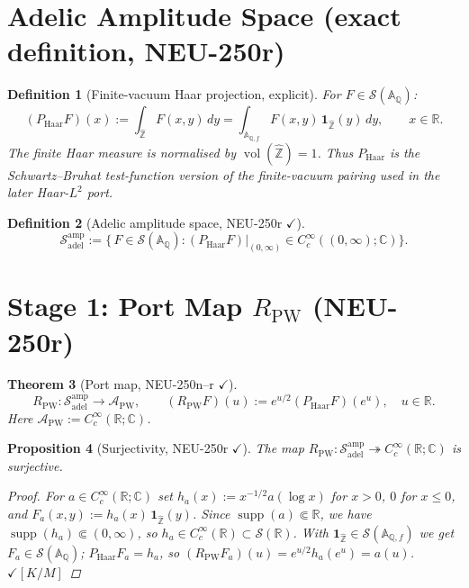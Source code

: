 \documentclass[11pt,a4paper]{amsart}
\newtheorem{theorem}{Theorem}[section]
\newtheorem{proposition}[theorem]{Proposition}
\newtheorem{definition}[theorem]{Definition}
\begin{document}
\section{Adelic Amplitude Space (exact definition, NEU-250r)}

\begin{definition}[Finite-vacuum Haar projection, explicit]\label{def:haar}
For $F\in\mathcal{S}(\mathbb{A}_{\mathbb{Q}})$:
\[
  \boxed{
  (P_{\mathrm{Haar}}F)(x)
  := \int_{\widehat{\mathbb Z}} F(x,y)\,dy
  = \int_{\mathbb A_{\mathbb Q,f}}
      F(x,y)\,\mathbf 1_{\widehat{\mathbb Z}}(y)\,dy,
  \qquad x\in\mathbb{R}.}
\]
The finite Haar measure is normalised by
$\operatorname{vol}(\widehat{\mathbb Z})=1$.
Thus $P_{\mathrm{Haar}}$ is the Schwartz--Bruhat test-function version of the
finite-vacuum pairing used in the later Haar-$L^2$ port.
\end{definition}

\begin{definition}[Adelic amplitude space, NEU-250r $\checkmark$]
\[
  \boxed{
  \mathcal{S}_{\mathrm{adel}}^{\mathrm{amp}} :=
  \bigl\{\, F\in\mathcal{S}(\mathbb{A}_{\mathbb{Q}}) :
  (P_{\mathrm{Haar}}F)|_{(0,\infty)} \in C_c^\infty((0,\infty);\mathbb{C})
  \bigr\}.}
\]
\end{definition}

\section{Stage 1: Port Map $R_{\mathrm{PW}}$ (NEU-250r)}

\begin{theorem}[Port map, NEU-250n--r $\checkmark$]
\[
  \boxed{
  R_{\mathrm{PW}} : \mathcal{S}_{\mathrm{adel}}^{\mathrm{amp}}
  \longrightarrow \mathcal{A}_{\mathrm{PW}},
  \qquad
  (R_{\mathrm{PW}}F)(u) := e^{u/2}(P_{\mathrm{Haar}}F)(e^u),
  \quad u\in\mathbb{R}.}
\]
Here $\mathcal{A}_{\mathrm{PW}}:=C_c^\infty(\mathbb{R};\mathbb{C})$.
\end{theorem}

\begin{proposition}[Surjectivity, NEU-250r $\checkmark$]
\label{prop:rpw-surjective}
The map $R_{\mathrm{PW}}:\mathcal{S}_{\mathrm{adel}}^{\mathrm{amp}}
\twoheadrightarrow C_c^\infty(\mathbb{R};\mathbb{C})$ is surjective.
\begin{proof}
For $a\in C_c^\infty(\mathbb{R};\mathbb{C})$ set
$h_a(x):=x^{-1/2}a(\log x)$ for $x>0$, $0$ for $x\le0$,
and $F_a(x,y):=h_a(x)\,\mathbf{1}_{\widehat{\mathbb{Z}}}(y)$.
Since $\operatorname{supp}(a)\Subset\mathbb{R}$,
we have $\operatorname{supp}(h_a)\Subset(0,\infty)$,
so $h_a\in C_c^\infty(\mathbb{R})\subset\mathcal{S}(\mathbb{R})$.
With $\mathbf{1}_{\widehat{\mathbb{Z}}}\in\mathcal{S}(\mathbb{A}_{\mathbb{Q},f})$
we get $F_a\in\mathcal{S}(\mathbb{A}_{\mathbb{Q}})$;
$P_{\mathrm{Haar}}F_a=h_a$, so $(R_{\mathrm{PW}}F_a)(u)=e^{u/2}h_a(e^u)=a(u)$.
\hfill$\checkmark[K/M]$
\end{proof}
\end{proposition}
\end{document}
